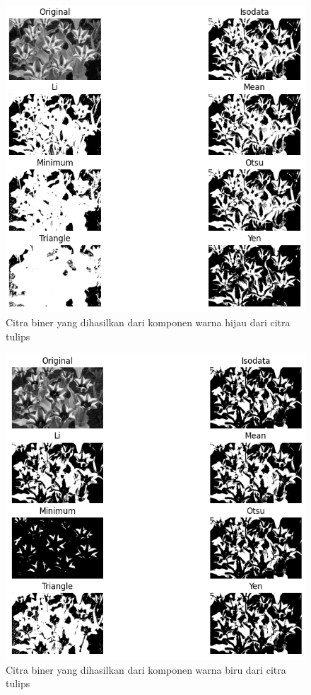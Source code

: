  \begin{figure}
   \begin{center}
     \includegraphics[scale=.65]{pics/tryAllthTulipsGreen.png}
     \caption{Citra biner yang dihasilkan dari komponen warna hijau dari citra tulips}
     \label{fig:tryThGreen}
   \end{center}
 \end{figure}
 
 \begin{figure}
   \begin{center}
     \includegraphics[scale=.65]{pics/tryAllthTulipsBlue.png}
     \caption{Citra biner yang dihasilkan dari komponen warna biru dari citra tulips}
     \label{fig:tryThBlue}
   \end{center}
 \end{figure}
 
